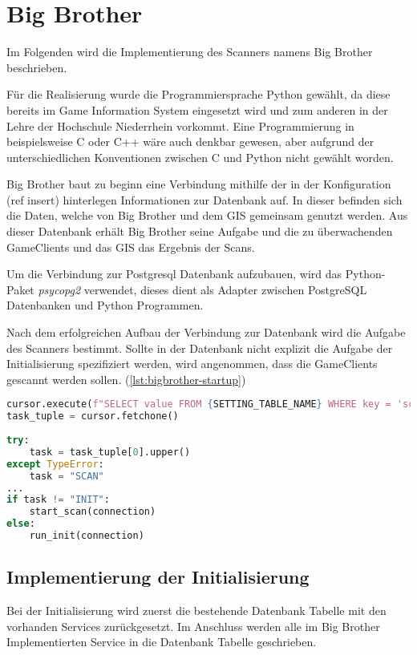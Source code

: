 \section{Big Brother}

Im Folgenden wird die Implementierung des Scanners namens Big Brother beschrieben.

Für die Realisierung wurde die Programmiersprache Python gewählt, da diese bereits im Game Information System eingesetzt wird und zum anderen in der Lehre der Hochschule Niederrhein vorkommt. Eine Programmierung in beispielsweise C oder C++ wäre auch denkbar gewesen, aber aufgrund der unterschiedlichen Konventionen zwischen C und Python nicht gewählt worden.

Big Brother baut zu beginn eine Verbindung mithilfe der in der Konfiguration (ref insert) hinterlegen Informationen zur Datenbank auf. In dieser befinden sich die Daten, welche von Big Brother und dem GIS gemeinsam genutzt werden. Aus dieser Datenbank erhält Big Brother seine Aufgabe und die zu überwachenden GameClients und das GIS das Ergebnis der Scans.

Um die Verbindung zur Postgresql Datenbank aufzubauen, wird das Python-Paket \textit{psycopg2} verwendet, dieses dient als Adapter zwischen PostgreSQL Datenbanken und Python Programmen. 

Nach dem erfolgreichen Aufbau der Verbindung zur Datenbank wird die Aufgabe des Scanners bestimmt. Sollte in der Datenbank nicht explizit die Aufgabe der Initialisierung spezifiziert werden, wird angenommen, dass die GameClients gescannt werden sollen. (\ref{lst:bigbrother-startup})

\begin{lstlisting}[language=Python, frame=single, caption={Aufgabe des Scanners}, captionpos=b, label={lst:bigbrother-startup}]
cursor.execute(f"SELECT value FROM {SETTING_TABLE_NAME} WHERE key = 'scanner.task'")
task_tuple = cursor.fetchone()
	
try:
	task = task_tuple[0].upper()
except TypeError:
	task = "SCAN"
...
if task != "INIT":
	start_scan(connection)
else:
	run_init(connection)	
\end{lstlisting}


\subsection{Implementierung der Initialisierung}

Bei der Initialisierung wird zuerst die bestehende Datenbank Tabelle mit den vorhanden Services zurückgesetzt.
Im Anschluss werden alle im Big Brother Implementierten Service in die Datenbank Tabelle geschrieben. 

